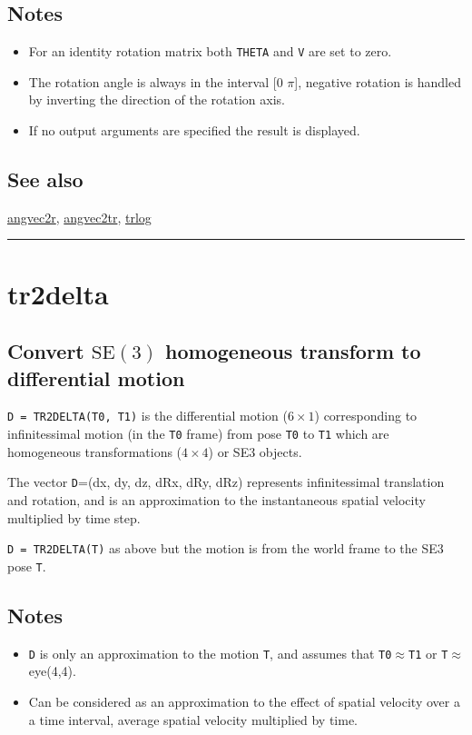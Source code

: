 \subsection*{Notes}
\begin{itemize}
  \item For an identity rotation matrix both \texttt{THETA} and \texttt{V} are set to zero.
  \item The rotation angle is always in the interval [0 $\pi$], negative rotation    is handled by inverting the direction of the rotation axis.
  \item If no output arguments are specified the result is displayed.
\end{itemize}

\subsection*{See also}


\hyperlink{angvec2r}{\color{blue} angvec2r}, \hyperlink{angvec2tr}{\color{blue} angvec2tr}, \hyperlink{trlog}{\color{blue} trlog}

\vspace{1.5ex}\rule{\textwidth}{1mm}

\hypertarget{tr2delta}{\section*{tr2delta}}
\subsection*{Convert $\mbox{SE}(3)$ homogeneous transform to differential motion}


\texttt{D = TR2DELTA(T0, T1)} is the differential motion ($6 \times 1$) corresponding to
infinitessimal motion (in the \texttt{T0} frame) from pose \texttt{T0} to \texttt{T1} which are homogeneous
transformations ($4 \times 4$) or SE3 objects.



The vector \texttt{D}=(dx, dy, dz, dRx, dRy, dRz) represents infinitessimal translation
and rotation, and is an approximation to the instantaneous spatial velocity
multiplied by time step.



\texttt{D = TR2DELTA(T)} as above but the motion is from the world frame to the SE3
pose \texttt{T}.


\subsection*{Notes}
\begin{itemize}
  \item \texttt{D} is only an approximation to the motion \texttt{T}, and assumes    that \texttt{T0}$\approx$\texttt{T1} or \texttt{T}$\approx$eye(4,4).
  \item Can be considered as an approximation to the effect of spatial velocity over a    a time interval, average spatial velocity multiplied by time.
\end{itemize}

